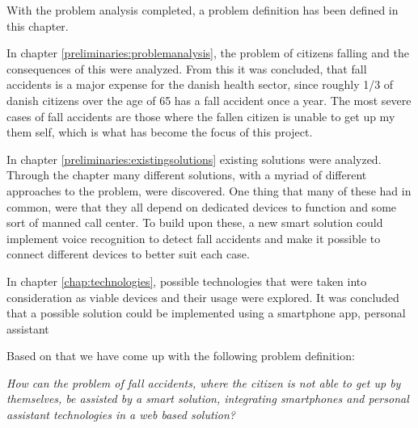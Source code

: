 \label{problemdefinition}
With the problem analysis completed, a problem definition has been defined in this chapter.

In chapter \ref{preliminaries:problemanalysis}, the problem of citizens falling and the consequences of this were analyzed. From this it was concluded, that fall accidents is a major expense for the danish health sector, since roughly 1/3 of danish citizens over the age of 65 has a fall accident once a year. The most severe cases of fall accidents are those where the fallen citizen is unable to get up my them self, which is what has become the focus of this project.

In chapter \ref{preliminaries:existingsolutions} existing solutions were analyzed. Through the chapter many different solutions, with a myriad of different approaches to the problem, were discovered. One thing that many of these had in common, were that they all depend on dedicated devices to function and some sort of manned call center. To build upon these, a new smart solution could implement voice recognition to detect fall accidents and make it possible to connect different devices to better suit each case.

In chapter \ref{chap:technologies}, possible technologies that were taken into consideration as viable devices and their usage were explored. It was concluded that a possible solution could be implemented using a smartphone app, personal assistant

Based on that we have come up with the following problem definition:
\begin{center}
  \textit{How can the problem of fall accidents, where the citizen is not able to get up by themselves, be assisted by a smart solution, integrating smartphones and personal assistant technologies in a web based solution?}  
\end{center}
